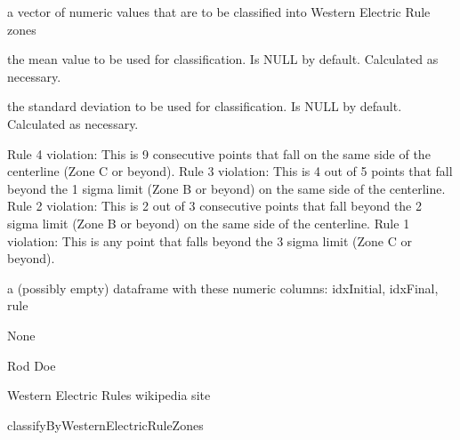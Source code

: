 \documentclass[a4paper]{book}
\begin{document}
%
\begin{Arguments}
\begin{ldescription}
\item[\code{x}] 
a vector of numeric values that are to be classified into Western Electric Rule zones

\item[\code{x.bar}] 
the mean value to be used for classification.  Is NULL by default.  Calculated as necessary.

\item[\code{sigma}] 
the standard deviation to be used for classification.  Is NULL by default.  Calculated as necessary.

\end{ldescription}
\end{Arguments}
%
\begin{Details}\relax
Rule 4 violation:  This is 9 consecutive points that fall on the same side of the centerline (Zone C or beyond).
Rule 3 violation:  This is 4 out of 5 points that fall beyond the 1 sigma limit (Zone B or beyond) on the same side of the centerline.
Rule 2 violation:  This is 2 out of 3 consecutive points that fall beyond the 2 sigma limit (Zone B or beyond) on the same side of the centerline.
Rule 1 violation:  This is any point that falls beyond the 3 sigma limit (Zone C or beyond).
\end{Details}
%
\begin{Value}
a (possibly empty) dataframe with these numeric columns:  idxInitial, idxFinal, rule
\end{Value}
%
\begin{Note}\relax
None
\end{Note}
%
\begin{Author}\relax
Rod Doe
\end{Author}
%
\begin{References}\relax
Western Electric Rules wikipedia site
\end{References}
%
\begin{SeeAlso}\relax
classifyByWesternElectricRuleZones
\end{SeeAlso}
%
\end{document}
